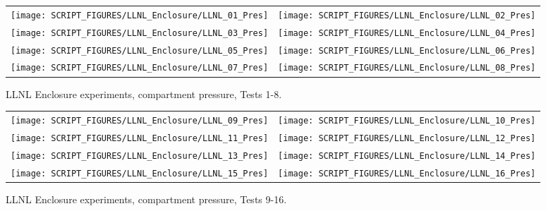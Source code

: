 \begin{figure}[p]
\begin{tabular*}{\textwidth}{l@{\extracolsep{\fill}}r}
\texttt{[image: SCRIPT\_FIGURES/LLNL\_Enclosure/LLNL\_01\_Pres]} &
\texttt{[image: SCRIPT\_FIGURES/LLNL\_Enclosure/LLNL\_02\_Pres]} \\
\texttt{[image: SCRIPT\_FIGURES/LLNL\_Enclosure/LLNL\_03\_Pres]} &
\texttt{[image: SCRIPT\_FIGURES/LLNL\_Enclosure/LLNL\_04\_Pres]} \\
\texttt{[image: SCRIPT\_FIGURES/LLNL\_Enclosure/LLNL\_05\_Pres]} &
\texttt{[image: SCRIPT\_FIGURES/LLNL\_Enclosure/LLNL\_06\_Pres]} \\
\texttt{[image: SCRIPT\_FIGURES/LLNL\_Enclosure/LLNL\_07\_Pres]} &
\texttt{[image: SCRIPT\_FIGURES/LLNL\_Enclosure/LLNL\_08\_Pres]}
\end{tabular*}
\caption[LLNL Enclosure experiments, compartment pressure, Tests 1-8]{LLNL Enclosure experiments, compartment pressure, Tests 1-8.}
\label{LLNL_Enclosure_Pres_1}
\end{figure}

\begin{figure}[p]
\begin{tabular*}{\textwidth}{l@{\extracolsep{\fill}}r}
\texttt{[image: SCRIPT\_FIGURES/LLNL\_Enclosure/LLNL\_09\_Pres]} &
\texttt{[image: SCRIPT\_FIGURES/LLNL\_Enclosure/LLNL\_10\_Pres]} \\
\texttt{[image: SCRIPT\_FIGURES/LLNL\_Enclosure/LLNL\_11\_Pres]} &
\texttt{[image: SCRIPT\_FIGURES/LLNL\_Enclosure/LLNL\_12\_Pres]} \\
\texttt{[image: SCRIPT\_FIGURES/LLNL\_Enclosure/LLNL\_13\_Pres]} &
\texttt{[image: SCRIPT\_FIGURES/LLNL\_Enclosure/LLNL\_14\_Pres]} \\
\texttt{[image: SCRIPT\_FIGURES/LLNL\_Enclosure/LLNL\_15\_Pres]} &
\texttt{[image: SCRIPT\_FIGURES/LLNL\_Enclosure/LLNL\_16\_Pres]}
\end{tabular*}
\caption[LLNL Enclosure experiments, compartment pressure, Tests 9-16]{LLNL Enclosure experiments, compartment pressure, Tests 9-16.}
\label{LLNL_Enclosure_Pres_2}
\end{figure}

